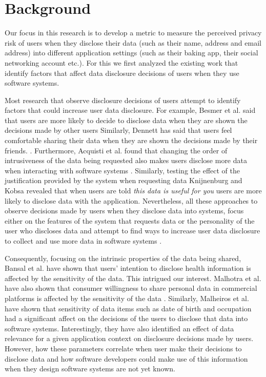 \documentclass[10pt]{article}
\begin{document}
\section {Background}

Our focus in this research is to develop a metric to measure the perceived privacy risk of users when they disclose their data (such as their name, address and email address) into different application settings (such as their baking app, their social networking account etc.). For this we first analyzed the existing work that identify factors that affect data disclosure decisions of users when they use software systems. 

Most research that observe disclosure decisions of users attempt to identify factors that could increase user data disclosure. For example, Besmer et al. said that users are more likely to decide to disclose data when they are shown the decisions made by other users \cite {besmer2010impact} Similarly, Dennett has said that users feel comfortable sharing their data when they are shown the decisions made by their friends. \cite {dennett2000little}. Furthermore, Acquisti et al. found that changing the order of intrusiveness of the data being requested also makes users disclose more data when interacting with software systems \cite {acquisti2012impact}. Similarly, testing the effect of the justification provided by the system when requesting data Knijnenburg and Kobsa \cite {knijnenburg2013helping} revealed that when users are told \textit{this data is useful for you} users are more likely to disclose data with the application. Nevertheless, all these approaches to observe decisions made by users when they disclose data into systems, focus either on the features of the system that requests data \cite {li2010understanding, wang2016context, malheiros2013fairly} or the personality of the user who discloses data \cite {nissenbaum2009privacy} and attempt to find ways to increase user data disclosure to collect and use more data in software systems \cite {dennett2000little}. 

Consequently, focusing on the intrinsic properties of the data being shared, Bansal et al. have shown that users' intention to disclose health information is affected by the sensitivity of the data\cite {bansal2010impact}. This intrigued our interest. Malhotra et al. have also shown that consumer willingness to share personal data in commercial platforms is affected by the sensitivity of the data \cite {malhotra2004internet}. Similarly, Malheiros et al. \cite {malheiros2013fairly} have shown that sensitivity of data items such as date of birth and occupation had a significant affect on the decisions of the users to disclose that data into software systems. Interestingly, they have also identified an effect of data relevance for a given application context on disclosure decisions made by users. However, how these parameters correlate when user make their decisions to disclose data and how software developers could make use of this information when they design software systems are not yet known.
\end{document}
